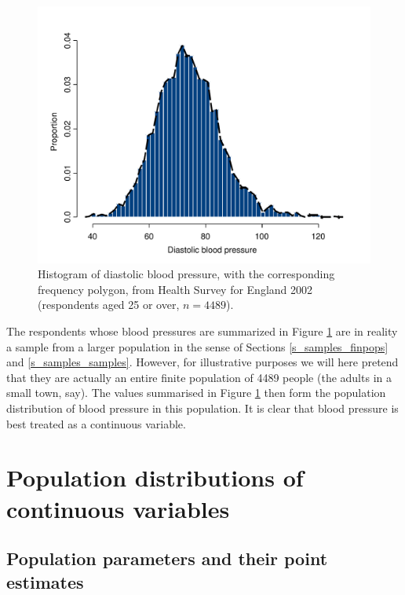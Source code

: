\begin{figure}
\caption{Histogram of diastolic blood pressure, with the corresponding
frequency polygon, from Health Survey for
England 2002 (respondents aged 25 or over, $n=4489$).}
\label{f_bp1}
\begin{center}

\includegraphics[width=13.5cm]{bloodp1}
\end{center}
%
\end{figure}

The respondents whose blood pressures are summarized in Figure
\ref{f_bp1} are in reality a sample from a larger population in the
sense of Sections \ref{s_samples_finpops} and \ref{s_samples_samples}.
However, for illustrative purposes we will here pretend that they are
actually an entire finite population of 4489 people (the adults in a
small town, say). The values summarised in Figure \ref{f_bp1} then form
the population distribution of blood pressure in this population. It is
clear that blood pressure is best treated as a continuous variable.


\section{Population distributions of continuous variables}
\label{s_contd_popdistrs}

\subsection{Population parameters and their point estimates}
\label{ss_contd_popdistrs_params}

